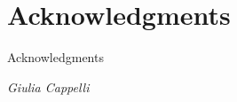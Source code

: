 \chapter*{Acknowledgments}

Acknowledgments


\begin{flushright}
	\textit{Giulia Cappelli}
\end{flushright}
